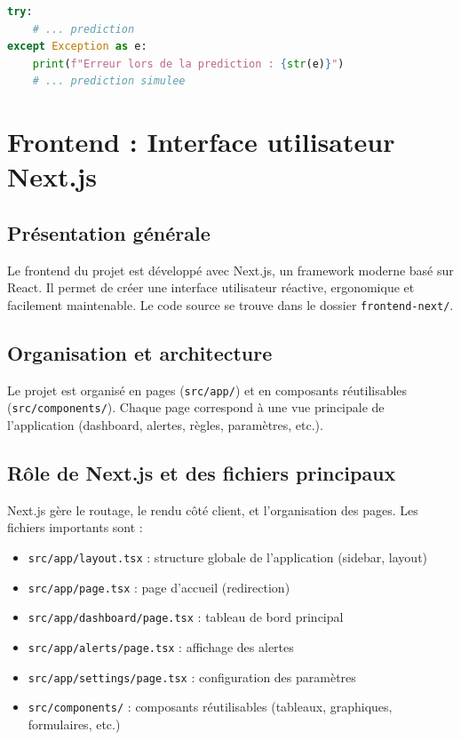 \documentclass[a4paper,12pt]{article}
\begin{document}
\begin{lstlisting}[language=Python]
try:
    # ... prediction
except Exception as e:
    print(f"Erreur lors de la prediction : {str(e)}")
    # ... prediction simulee
\end{lstlisting}

\section{Frontend : Interface utilisateur Next.js}

\subsection{Présentation générale}
Le frontend du projet est développé avec Next.js, un framework moderne basé sur React. Il permet de créer une interface utilisateur réactive, ergonomique et facilement maintenable. Le code source se trouve dans le dossier \texttt{frontend-next/}.

\subsection{Organisation et architecture}
Le projet est organisé en pages (\texttt{src/app/}) et en composants réutilisables (\texttt{src/components/}). Chaque page correspond à une vue principale de l'application (dashboard, alertes, règles, paramètres, etc.).

\subsection{Rôle de Next.js et des fichiers principaux}
Next.js gère le routage, le rendu côté client, et l'organisation des pages. Les fichiers importants sont :
\begin{itemize}
  \item \texttt{src/app/layout.tsx} : structure globale de l'application (sidebar, layout)
  \item \texttt{src/app/page.tsx} : page d'accueil (redirection)
  \item \texttt{src/app/dashboard/page.tsx} : tableau de bord principal
  \item \texttt{src/app/alerts/page.tsx} : affichage des alertes
  \item \texttt{src/app/settings/page.tsx} : configuration des paramètres
  \item \texttt{src/components/} : composants réutilisables (tableaux, graphiques, formulaires, etc.)
\end{itemize}
\end{document}
